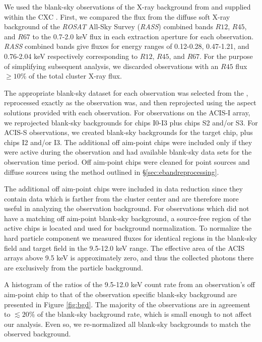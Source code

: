 We used the blank-sky observations of the X-ray background from
\citet{2001ApJ...562L.153M} and supplied within the CXC \caldb. First,
we compared the flux from the diffuse soft X-ray background of the
{\it{ROSAT}} All-Sky Survey ({\it RASS}) combined bands $R12$, $R45$,
and $R67$ to the 0.7-2.0 keV flux in each extraction aperture for each
observation. {\it RASS} combined bands give fluxes for energy ranges
of 0.12-0.28, 0.47-1.21, and 0.76-2.04 keV respectively corresponding
to $R12$, $R45$, and $R67$. For the purpose of simplifying subsequent
analysis, we discarded observations with an $R45$ flux $\geq 10\%$ of
the total cluster X-ray flux.

The appropriate blank-sky dataset for each observation was selected
from the \caldb, reprocessed exactly as the observation was, and then
reprojected using the aspect solutions provided with each
observation. For observations on the ACIS-I array, we reprojected
blank-sky backgrounds for chips I0-I3 plus chips S2 and/or S3. For
ACIS-S observations, we created blank-sky backgrounds for the target
chip, plus chips I2 and/or I3. The additional off aim-point chips were
included only if they were active during the observation and had
available blank-sky data sets for the observation time period. Off
aim-point chips were cleaned for point sources and diffuse sources
using the method outlined in \S\ref{sec:ebandreprocessing}.

The additional off aim-point chips were included in data reduction
since they contain data which is farther from the cluster center and
are therefore more useful in analyzing the observation background. For
observations which did not have a matching off aim-point blank-sky
background, a source-free region of the active chips is
located and used for background normalization. To normalize the hard
particle component we measured fluxes for identical regions in the
blank-sky field and target field in the 9.5-12.0 keV range. The
effective area of the ACIS arrays above 9.5 keV is approximately zero,
and thus the collected photons there are exclusively from the particle
background.

A histogram of the ratios of the 9.5-12.0 keV count rate from an
observation's off aim-point chip to that of the observation specific
blank-sky background are presented in Figure \ref{fig:bgd}. The
majority of the observations are in agreement to $\lesssim 20\%$ of
the blank-sky background rate, which is small enough to not affect our
analysis. Even so, we re-normalized all blank-sky backgrounds to match
the observed background.

